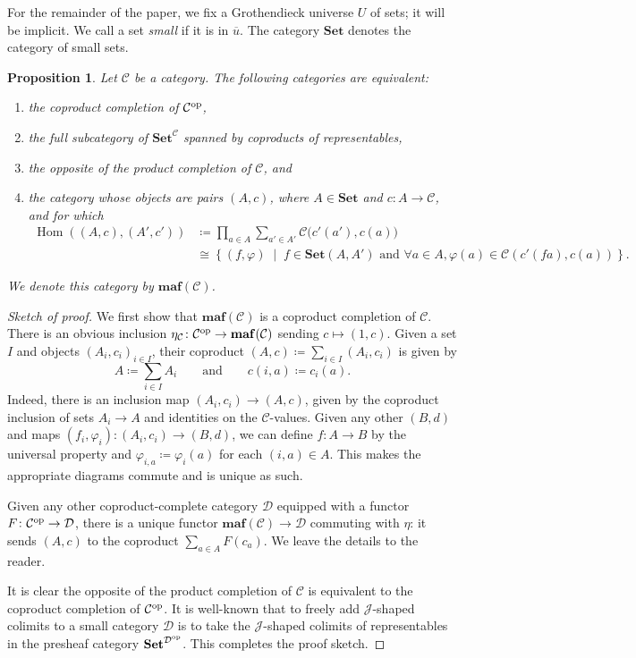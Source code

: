 \documentclass[11pt, one side, article]{memoir}
\theoremstyle{definition}
\theoremstyle{plain}
\newtheorem{proposition}[definitionx]{Proposition}
\DeclareMathOperator{\Hom}{Hom}
\newcommand{\cat}[1]{\mathcal{#1}}%
\newcommand{\Cat}[1]{\mathbf{#1}}%
\newcommand{\op}{^\tn{op}}
\newcommand{\tn}[1]{\textnormal{#1}}
\newcommand{\ol}[1]{\overline{#1}}
\newcommand{\smset}{\Cat{Set}}
\newcommand{\0}{\Cat{0}}
\newcommand{\1}{\Cat{1}}
\newcommand{\opfam}{\Cat{maf}}
\newcommand{\qqand}{\qquad\text{and}\qquad}
\begin{document}
For the remainder of the paper, we fix a Grothendieck universe $U$ of sets; it will be implicit. We call a set \emph{small} if it is in $\ol{u}$. The category $\smset$ denotes the category of small sets.

\begin{proposition}\label{prop.tfae}
Let $\cat{C}$ be a category. The following categories are equivalent:
\begin{enumerate}
	\item the coproduct completion of $\cat{C}\op$,
	\item the full subcategory of $\smset^\cat{C}$ spanned by coproducts of representables,
	\item the opposite of the product completion of $\cat{C}$, and
	\item the category whose objects are pairs $(A,c)$, where $A\in\smset$ and $c\colon A\to\cat{C}$, and for which
	\begin{align*}
	\Hom((A,c),(A',c'))&\coloneqq\prod_{a\in A}\sum_{a'\in A'}\cat{C}\big(c'(a'),c(a)\big)\\&\cong\left\{(f,\varphi)\;\middle|\; f\in\smset(A,A')\text{ and }\forall a\in A, \varphi(a)\in\cat{C}(c'(fa),c(a))\right\}.
	\end{align*}
\end{enumerate}
We denote this category by $\opfam(\cat{C})$.
\end{proposition}
\begin{proof}[Sketch of proof]
We first show that $\opfam(\cat{C})$ is a coproduct completion of $\cat{C}$. There is an obvious inclusion $\eta_\cat{C}\colon \cat{C}\op\to\opfam(\cat{C})$ sending $c\mapsto (1,c)$. Given a set $I$ and objects $(A_i,c_i)_{i\in I}$, their coproduct $(A,c)\coloneqq\sum_{i\in I}(A_i,c_i)$ is given by
\[
A\coloneqq\sum_{i\in I}A_i
\qqand
c(i,a)\coloneqq c_i(a).
\]
Indeed, there is an inclusion map $(A_i,c_i)\to (A,c)$, given by the coproduct inclusion of sets $A_i\to A$ and identities on the $\cat{C}$-values. Given any other $(B,d)$ and maps $(f_i,\varphi_i)\colon (A_i,c_i)\to(B,d)$, we can define $f\colon A\to B$ by the universal property and $\varphi_{i,a}\coloneqq\varphi_i(a)$ for each $(i,a)\in A$. This makes the appropriate diagrams commute and is unique as such.

Given any other coproduct-complete category $\cat{D}$ equipped with a functor $F\colon\cat{C}\op\to\cat{D}$, there is a unique functor $\opfam(\cat{C})\to\cat{D}$ commuting with $\eta$: it sends $(A,c)$ to the coproduct $\sum_{a\in A}F(c_a)$. We leave the details to the reader.

It is clear the opposite of the product completion of $\cat{C}$ is equivalent to the coproduct completion of $\cat{C}\op$. It is well-known that to freely add $\cat{J}$-shaped colimits to a small category $\cat{D}$ is to take the $\cat{J}$-shaped colimits of representables in the presheaf category $\smset^{\cat{D}\op}$. This completes the proof sketch.
\end{proof}
\end{document}
